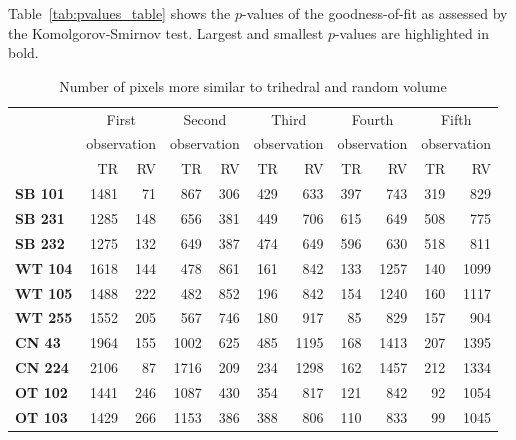 \documentclass[12pt]{article}
\begin{document}
Table~\ref{tab:pvalues_table} shows the $p$-values of the goodness-of-fit as assessed by the Komolgorov-Smirnov test. 
Largest and smallest $p$-values are highlighted in bold.

\begin{table}[hbt]
\centering
\caption{Number of pixels more similar to trihedral and random volume}\label{tab:size_sample}
\begin{tabular}{lrrrrrrrrrr}

\toprule
& \multicolumn{2}{c}{First} & \multicolumn{2}{c}{Second} & \multicolumn{2}{c}{Third} & \multicolumn{2}{c}{Fourth} & \multicolumn{2}{c}{Fifth}\\
& \multicolumn{2}{c}{observation} & \multicolumn{2}{c}{observation} & \multicolumn{2}{c}{observation} & \multicolumn{2}{c}{observation} & \multicolumn{2}{c}{observation}\\
& TR & RV & TR & RV & TR & RV & TR & RV& TR & RV\\
\cmidrule(lr){2-11}
\textbf{SB 101} & 1481 & 71 & 867 & 306 & 429 & 633 & 397 & 743 & 319 & 829\\
\textbf{SB 231} & 1285 & 148 & 656 & 381 & 449 & 706 & 615 & 649 & 508 & 775\\
\textbf{SB 232} & 1275 & 132 & 649 & 387 & 474 & 649 & 596 & 630 & 518 & 811\\
\textbf{WT 104} & 1618 & 144 & 478 & 861 & 161 & 842 & 133 & 1257 & 140 & 1099\\
\textbf{WT 105} & 1488 & 222 & 482 & 852 & 196 & 842 & 154 & 1240 & 160 & 1117\\
\textbf{WT 255} & 1552 & 205 & 567 & 746 & 180 & 917 & 85 & 829 & 157 & 904\\
\textbf{CN 43}  & 1964 & 155 & 1002 & 625 & 485 & 1195 & 168 & 1413 & 207 & 1395\\
\textbf{CN 224} & 2106 & 87 & 1716 & 209 & 234 & 1298 & 162 & 1457 & 212 & 1334\\
\textbf{OT 102} & 1441 & 246 & 1087 & 430 & 354 & 817 & 121 & 842 & 92 & 1054\\
\textbf{OT 103} & 1429 & 266 & 1153 & 386 & 388 & 806 & 110 & 833 & 99 & 1045\\
\bottomrule
\end{tabular} 
\end{table}
\end{document}
